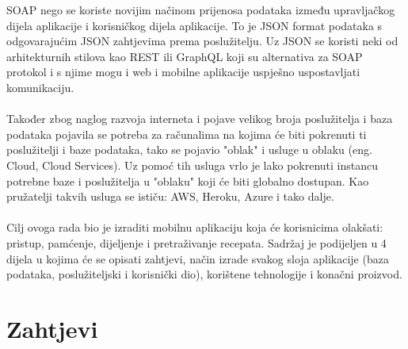 \documentclass[times, utf8, zavrsni]{fer}
\begin{document}
SOAP nego se koriste novijim načinom prijenosa
podataka između upravljačkog dijela aplikacije i korisničkog dijela aplikacije.
To je JSON format podataka s odgovarajućim JSON zahtjevima prema poslužitelju.
Uz JSON se koristi neki od arhitekturnih stilova kao REST ili GraphQL koji su alternativa
za SOAP protokol i s njime mogu i web i mobilne aplikacije uspješno uspostavljati komunikaciju.
\\\\
Također zbog naglog razvoja interneta i pojave velikog broja poslužitelja i baza podataka
pojavila se potreba za računalima na kojima će biti pokrenuti ti poslužitelji i
baze podataka, tako se pojavio "oblak" i usluge u oblaku (eng. Cloud, Cloud Services).
Uz pomoć tih usluga vrlo je lako pokrenuti instancu potrebne baze i poslužitelja
u "oblaku" koji će biti globalno dostupan. Kao pružatelji takvih usluga se ističu:
AWS, Heroku, Azure i tako dalje.
\\\\
Cilj ovoga rada bio je izraditi mobilnu aplikaciju koja će korisnicima olakšati: pristup,
pamćenje, dijeljenje i pretraživanje recepata. Sadržaj je podijeljen u 4 dijela u kojima
će se opisati zahtjevi, način izrade svakog sloja aplikacije (baza podataka,
poslužiteljski i korisnički dio), korištene tehnologije i konačni proizvod.

\chapter{Zahtjevi}
\end{document}
